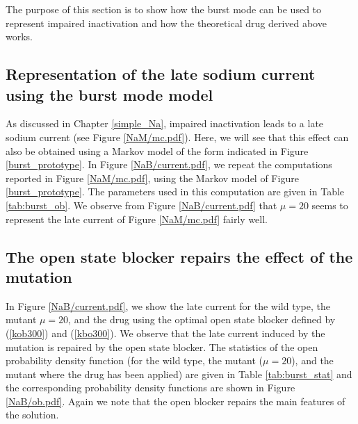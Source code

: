 
The purpose of this section is to show how the burst mode can be used to represent impaired inactivation and how the theoretical drug derived above works. 

\subsection{Representation of the late sodium current using the burst mode model}

As discussed in Chapter \ref{simple_Na}, impaired inactivation leads to a late sodium current (see Figure \ref{NaM/mc.pdf}). Here, we will see that this effect can also be obtained using a Markov model of the form indicated in Figure \ref{burst_prototype}. In Figure \ref{NaB/current.pdf}, we repeat the computations reported in Figure \ref{NaM/mc.pdf}, using the Markov model of Figure \ref{burst_prototype}. The parameters used in this computation are given in Table \ref{tab:burst_ob}. We observe from Figure \ref{NaB/current.pdf} that $\mu=20$ seems to represent the late current of Figure \ref{NaM/mc.pdf} fairly well. 
 
 \subsection{The open state blocker repairs the effect of the mutation}

In Figure \ref{NaB/current.pdf}, we show the late current for the wild type, the mutant $\mu=20$, and the drug using the optimal open state blocker defined by (\ref{kob300}) and (\ref{kbo300}). We observe that the late current induced by the mutation is  repaired by the open state blocker. The statistics of the open probability density function (for the wild type, the mutant ($\mu=20$), and the mutant where the drug has been applied) are given in Table \ref{tab:burst_stat} and  
the corresponding probability density functions are shown in Figure \ref{NaB/ob.pdf}. Again we note that the open blocker repairs the main features of the solution.



